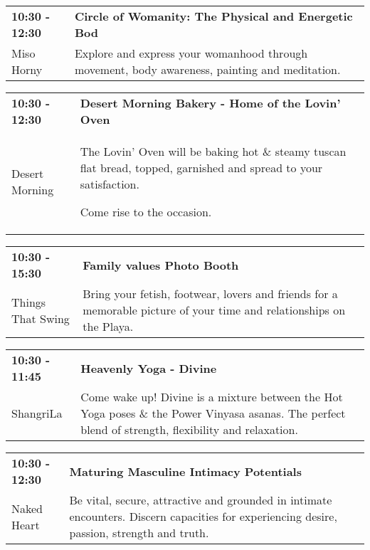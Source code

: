 \begin{tabular}{ p{1in} p{2.2in} }
    \textbf{10:30 - 12:30} & \textbf{Circle of Womanity: The Physical and Energetic Bod} \\
    Miso Horny \newline  & Explore and express your womanhood through movement, body awareness, painting and meditation. \\
    \hline 
\end{tabular}
    
\begin{tabular}{ p{1in} p{2.2in} }
    \textbf{10:30 - 12:30} & \textbf{Desert Morning Bakery - Home of the Lovin' Oven} \\
    Desert Morning \newline  & The Lovin' Oven will be baking hot \& steamy tuscan flat bread, topped, garnished and spread to your satisfaction.

Come rise to the occasion. \\
    \hline 
\end{tabular}
    
\begin{tabular}{ p{1in} p{2.2in} }
    \textbf{10:30 - 15:30} & \textbf{Family values Photo Booth} \\
    Things That Swing \newline  & Bring your fetish, footwear, lovers and friends for a memorable picture of your time and relationships on the Playa. \\
    \hline 
\end{tabular}
    
\begin{tabular}{ p{1in} p{2.2in} }
    \textbf{10:30 - 11:45} & \textbf{Heavenly Yoga - Divine} \\
    ShangriLa \newline  & Come wake up! Divine is a mixture between the Hot Yoga poses \& the Power Vinyasa asanas. The perfect blend of strength, flexibility and relaxation. \\
    \hline 
\end{tabular}
    
\begin{tabular}{ p{1in} p{2.2in} }
    \textbf{10:30 - 12:30} & \textbf{Maturing Masculine Intimacy Potentials} \\
    Naked Heart \newline  & Be vital, secure, attractive and grounded in intimate encounters. Discern capacities for experiencing desire, passion, strength and truth. \\
    \hline 
\end{tabular}
    
